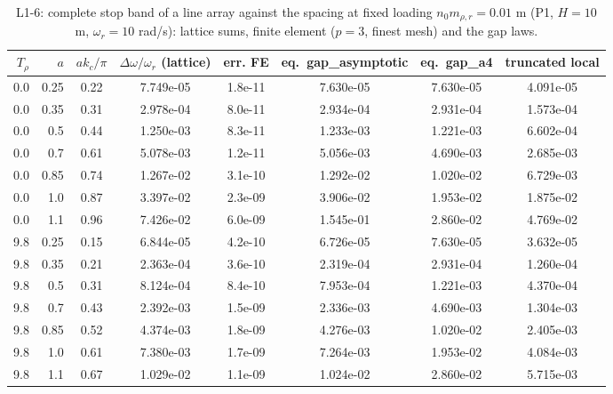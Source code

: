 \begin{table}[htbp]
\centering
\caption{L1-6: complete stop band of a line array against the spacing at fixed loading $n_0m_{\rho,r} = 0.01$ m (P1, $H = 10$ m, $\omega_r = 10$ rad/s): lattice sums, finite element ($p = 3$, finest mesh) and the gap laws.}
\label{tab:L1-6}
\begin{tabular}{rrcccccc}
\toprule
$T_\rho$ & $a$ & $ak_c/\pi$ & $\Delta\omega/\omega_r$ (lattice) & err. FE & eq.~gap\_asymptotic & eq.~gap\_a4 & truncated local \\
\midrule
0.0 & 0.25 & 0.22 & 7.749e-05 & 1.8e-11 & 7.630e-05 & 7.630e-05 & 4.091e-05 \\
0.0 & 0.35 & 0.31 & 2.978e-04 & 8.0e-11 & 2.934e-04 & 2.931e-04 & 1.573e-04 \\
0.0 & 0.5 & 0.44 & 1.250e-03 & 8.3e-11 & 1.233e-03 & 1.221e-03 & 6.602e-04 \\
0.0 & 0.7 & 0.61 & 5.078e-03 & 1.2e-11 & 5.056e-03 & 4.690e-03 & 2.685e-03 \\
0.0 & 0.85 & 0.74 & 1.267e-02 & 3.1e-10 & 1.292e-02 & 1.020e-02 & 6.729e-03 \\
0.0 & 1.0 & 0.87 & 3.397e-02 & 2.3e-09 & 3.906e-02 & 1.953e-02 & 1.875e-02 \\
0.0 & 1.1 & 0.96 & 7.426e-02 & 6.0e-09 & 1.545e-01 & 2.860e-02 & 4.769e-02 \\
9.8 & 0.25 & 0.15 & 6.844e-05 & 4.2e-10 & 6.726e-05 & 7.630e-05 & 3.632e-05 \\
9.8 & 0.35 & 0.21 & 2.363e-04 & 3.6e-10 & 2.319e-04 & 2.931e-04 & 1.260e-04 \\
9.8 & 0.5 & 0.31 & 8.124e-04 & 8.4e-10 & 7.953e-04 & 1.221e-03 & 4.370e-04 \\
9.8 & 0.7 & 0.43 & 2.392e-03 & 1.5e-09 & 2.336e-03 & 4.690e-03 & 1.304e-03 \\
9.8 & 0.85 & 0.52 & 4.374e-03 & 1.8e-09 & 4.276e-03 & 1.020e-02 & 2.405e-03 \\
9.8 & 1.0 & 0.61 & 7.380e-03 & 1.7e-09 & 7.264e-03 & 1.953e-02 & 4.084e-03 \\
9.8 & 1.1 & 0.67 & 1.029e-02 & 1.1e-09 & 1.024e-02 & 2.860e-02 & 5.715e-03 \\
\bottomrule
\end{tabular}
\end{table}
